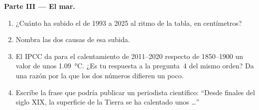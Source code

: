 \begin{problem}
\noindent\textbf{Parte III --- El mar.}\par\nopagebreak
\begin{enumerate}[resume, beginpenalty=10000]
  \item ¿Cuánto ha subido el  de 1993 a 2025 al ritmo de la tabla, en
        centímetros?
  \item Nombra las dos causas de esa subida.
  \item El IPCC da para el calentamiento de 2011--2020 respecto de
        1850--1900 un valor de unos \qty{1.09}{\degreeCelsius}. ¿Es tu
        respuesta a la pregunta~4 del mismo orden? Da una razón por la que
        los dos números difieren un poco.
  \item Escribe la frase que podría publicar un periodista científico:
        ``Desde finales del siglo XIX, la superficie de la Tierra se ha
        calentado unos \ldots''
\end{enumerate}
\end{problem}
